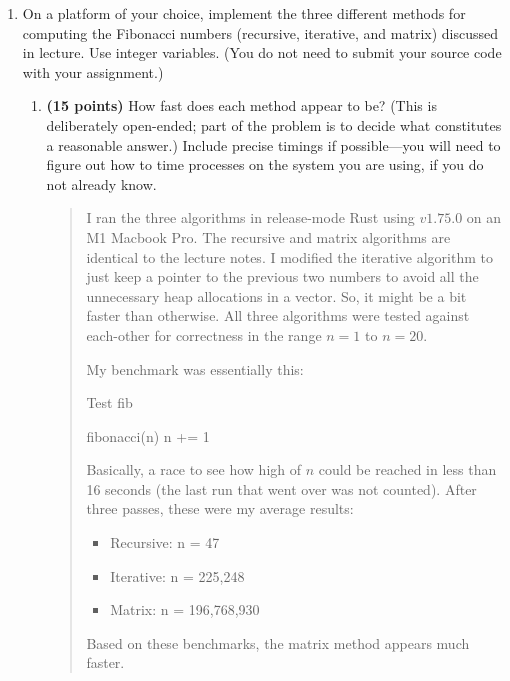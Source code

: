 \documentclass[11pt]{article}
\begin{document}
\begin{enumerate}[leftmargin=*]
\item
On a platform of your choice, implement the three different methods for computing the Fibonacci
numbers (recursive, iterative, and matrix) discussed in lecture. Use integer variables. (You do not need to submit your source code with your assignment.)
\begin{enumerate}
\item
{\bf (15 points)}
How fast does
each method appear to be? (This is deliberately open-ended; part of the problem is to decide what constitutes a reasonable answer.)
Include precise timings if possible---you will need to figure out how to time processes on the system
you are using, if you do not already know.
\begin{quote}
  \color{purple}
  I ran the three algorithms in release-mode Rust using $v1.75.0$ on an M1 Macbook Pro. The recursive and matrix algorithms are identical to the lecture notes. I modified the iterative algorithm to just keep a pointer to the previous two numbers to avoid all the unnecessary heap allocations in a vector. So, it might be a bit faster than otherwise. All three algorithms were tested against each-other for correctness in the range $n = 1$ to $n = 20$. 

  \medskip
  My benchmark was essentially this:
  \begin{algorithm}
  \caption{Test fib}
  \begin{algorithmic}
          \STATE fibonacci(n)
          \STATE n += 1
      \ENDFOR
  \ENDFOR
  \end{algorithmic}
  \end{algorithm}

  Basically, a race to see how high of $n$ could be reached in less than 16 seconds (the last run that went over was not counted). After three passes, these were my average results:
  \begin{itemize}
    \item Recursive: n = 47
    \item Iterative: n = 225,248
    \item Matrix: n = 196,768,930
  \end{itemize}

  Based on these benchmarks, the matrix method appears much faster. 
  

\end{quote}
\end{enumerate}
\end{enumerate}
\end{document}

